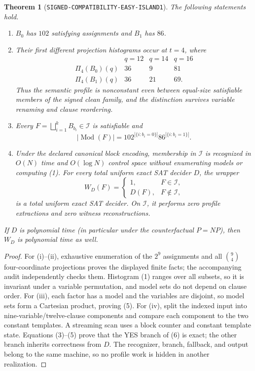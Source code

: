 \documentclass[11pt]{article}
\newtheorem{theorem}{Theorem}
\begin{document}
\begin{theorem}[\texttt{SIGNED-COMPATIBILITY-EASY-ISLAND1}]
The following statements hold.
\begin{enumerate}[label=(\roman*)]
\item $B_0$ has $102$ satisfying assignments and $B_1$ has $86$.
\item Their first different projection histograms occur at $t=4$, where
\[
\begin{array}{c|rrr}
&q=12&q=14&q=16\\ \hline
\Pi_4(B_0)(q)&36&9&81\\
\Pi_4(B_1)(q)&36&21&69.
\end{array} \tag{4}
\]
Thus the semantic profile is nonconstant even between equal-size satisfiable
members of the signed clean family, and the distinction survives variable
renaming and clause reordering.
\item Every $F=\bigsqcup_{i=1}^k B_{b_i}\in\mathcal I$ is satisfiable and
\[
 |\operatorname{Mod}(F)|=102^{|\{i:b_i=0\}|}86^{|\{i:b_i=1\}|}. \tag{5}
\]
\item Under the declared canonical block encoding, membership in $\mathcal I$
is recognized in $O(N)$ time and $O(\log N)$ control space without enumerating
models or computing (1).  For every total uniform exact SAT decider $D$, the
wrapper
\[
 W_D(F)=\begin{cases}1,&F\in\mathcal I,\\D(F),&F\notin\mathcal I,
 \end{cases} \tag{6}
\]
is a total uniform exact SAT decider.  On $\mathcal I$, it performs zero
profile extractions and zero witness reconstructions.
\end{enumerate}
If $D$ is polynomial time (in particular under the counterfactual $P=NP$),
then $W_D$ is polynomial time as well.
\end{theorem}

\begin{proof}
For (i)--(ii), exhaustive enumeration of the $2^9$ assignments and all
$\binom 94$ four-coordinate projections proves the displayed finite facts;
the accompanying audit independently checks them.  Histogram (1) ranges over
all subsets, so it is invariant under a variable permutation, and model sets
do not depend on clause order.  For (iii), each factor has a model and the
variables are disjoint, so model sets form a Cartesian product, proving (5).
For (iv), split the indexed input into nine-variable/twelve-clause components
and compare each component to the two constant templates.  A streaming scan
uses a block counter and constant template state.  Equations (3)--(5) prove
that the YES branch of (6) is exact; the other branch inherits correctness
from $D$.  The recognizer, branch, fallback, and output belong to the same
machine, so no profile work is hidden in another realization.
\end{proof}
\end{document}
